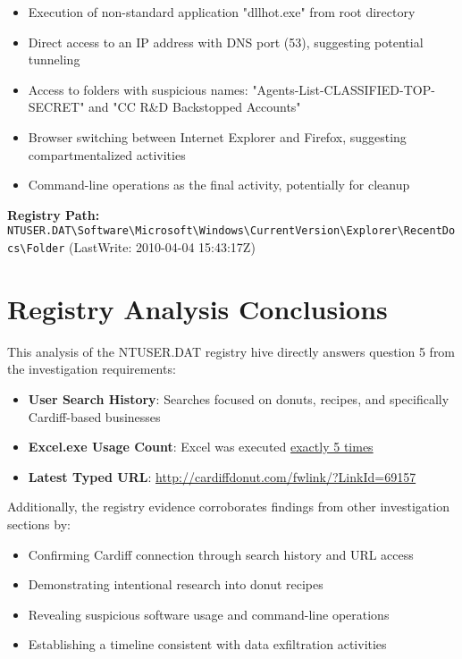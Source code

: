 \begin{itemize}
    \item Execution of non-standard application "dllhot.exe" from root directory
    \item Direct access to an IP address with DNS port (53), suggesting potential tunneling
    \item Access to folders with suspicious names: "Agents-List-CLASSIFIED-TOP-SECRET" and "CC R\&D Backstopped Accounts"
    \item Browser switching between Internet Explorer and Firefox, suggesting compartmentalized activities
    \item Command-line operations as the final activity, potentially for cleanup
\end{itemize}

\textbf{Registry Path:} \texttt{NTUSER.DAT\textbackslash Software\textbackslash Microsoft\textbackslash Windows\textbackslash CurrentVersion\textbackslash Explorer\textbackslash RecentDocs\textbackslash Folder} (LastWrite: 2010-04-04 15:43:17Z)

\section{Registry Analysis Conclusions}
This analysis of the NTUSER.DAT registry hive directly answers question 5 from the investigation requirements:

\begin{itemize}
    \item \textbf{User Search History}: Searches focused on donuts, recipes, and specifically Cardiff-based businesses
    \item \textbf{Excel.exe Usage Count}: Excel was executed \underline{exactly 5 times}
    \item \textbf{Latest Typed URL}: \url{http://cardiffdonut.com/fwlink/?LinkId=69157}
\end{itemize}

Additionally, the registry evidence corroborates findings from other investigation sections by:

\begin{itemize}
    \item Confirming Cardiff connection through search history and URL access
    \item Demonstrating intentional research into donut recipes
    \item Revealing suspicious software usage and command-line operations
    \item Establishing a timeline consistent with data exfiltration activities
\end{itemize}